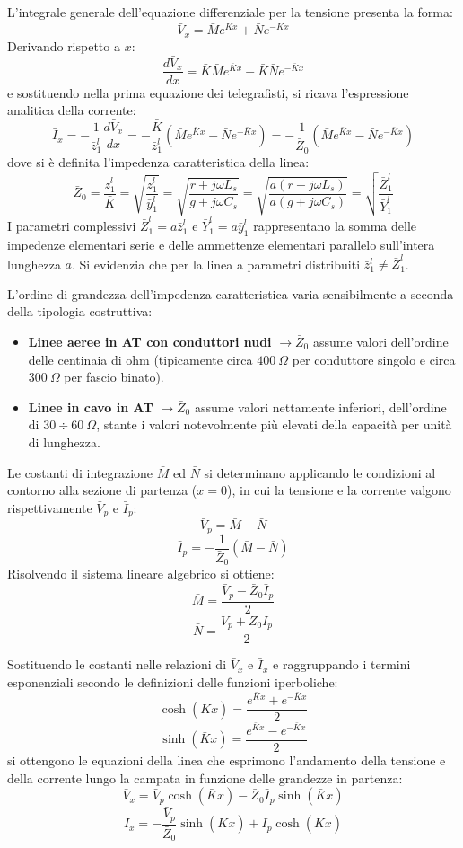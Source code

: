 L'integrale generale dell'equazione differenziale per la tensione presenta la forma:
\[\bar{V}_x = \bar{M} e^{\bar{K}x} + \bar{N} e^{-\bar{K}x}\]
Derivando rispetto a $x$:
\[\frac{d\bar{V}_x}{dx} = \bar{K} \bar{M} e^{\bar{K}x} - \bar{K} \bar{N} e^{-\bar{K}x}\]
e sostituendo nella prima equazione dei telegrafisti, si ricava l'espressione analitica della corrente:
\[\bar{I}_x = -\frac{1}{\bar{z}_1^l} \frac{d\bar{V}_x}{dx} = -\frac{\bar{K}}{\bar{z}_1^l} (\bar{M} e^{\bar{K}x} - \bar{N} e^{-\bar{K}x}) = -\frac{1}{\bar{Z}_0} (\bar{M} e^{\bar{K}x} - \bar{N} e^{-\bar{K}x})\]
dove si è definita l'impedenza caratteristica della linea:
\[\bar{Z}_0 = \frac{\bar{z}_1^l}{\bar{K}} = \sqrt{\frac{\bar{z}_1^l}{\bar{y}_1^l}} = \sqrt{\frac{r + j\omega L_s}{g + j\omega C_s}} = \sqrt{\frac{a(r + j\omega L_s)}{a(g + j\omega C_s)}} = \sqrt{\frac{\bar{Z}_1^l}{\bar{Y}_1^l}}\]
I parametri complessivi $\bar{Z}_1^l = a \bar{z}_1^l$ e $\bar{Y}_1^l = a \bar{y}_1^l$ rappresentano la somma delle impedenze elementari serie e delle ammettenze elementari parallelo sull'intera lunghezza $a$. Si evidenzia che per la linea a parametri distribuiti $\bar{z}_1^l \ne \bar{Z}_1^l$.

L'ordine di grandezza dell'impedenza caratteristica varia sensibilmente a seconda della tipologia costruttiva:
\begin{itemize}
    \item \textbf{Linee aeree in AT con conduttori nudi} $\rightarrow \bar{Z}_0$ assume valori dell'ordine delle centinaia di ohm (tipicamente circa $400\ \Omega$ per conduttore singolo e circa $300\ \Omega$ per fascio binato).
    \item \textbf{Linee in cavo in AT} $\rightarrow \bar{Z}_0$ assume valori nettamente inferiori, dell'ordine di $30 \div 60\ \Omega$, stante i valori notevolmente più elevati della capacità per unità di lunghezza.
\end{itemize}

Le costanti di integrazione $\bar{M}$ ed $\bar{N}$ si determinano applicando le condizioni al contorno alla sezione di partenza ($x = 0$), in cui la tensione e la corrente valgono rispettivamente $\bar{V}_p$ e $\bar{I}_p$:
\[\bar{V}_p = \bar{M} + \bar{N}\]
\[\bar{I}_p = -\frac{1}{\bar{Z}_0} (\bar{M} - \bar{N})\]
Risolvendo il sistema lineare algebrico si ottiene:
\[\bar{M} = \frac{\bar{V}_p - \bar{Z}_0 \bar{I}_p}{2}\]
\[\bar{N} = \frac{\bar{V}_p + \bar{Z}_0 \bar{I}_p}{2}\]

Sostituendo le costanti nelle relazioni di $\bar{V}_x$ e $\bar{I}_x$ e raggruppando i termini esponenziali secondo le definizioni delle funzioni iperboliche:
\[\cosh(\bar{K}x) = \frac{e^{\bar{K}x} + e^{-\bar{K}x}}{2}\]
\[\sinh(\bar{K}x) = \frac{e^{\bar{K}x} - e^{-\bar{K}x}}{2}\]
si ottengono le equazioni della linea che esprimono l'andamento della tensione e della corrente lungo la campata in funzione delle grandezze in partenza:
\[\bar{V}_x = \bar{V}_p \cosh(\bar{K}x) - \bar{Z}_0 \bar{I}_p \sinh(\bar{K}x)\]
\[\bar{I}_x = -\frac{\bar{V}_p}{\bar{Z}_0} \sinh(\bar{K}x) + \bar{I}_p \cosh(\bar{K}x)\]

